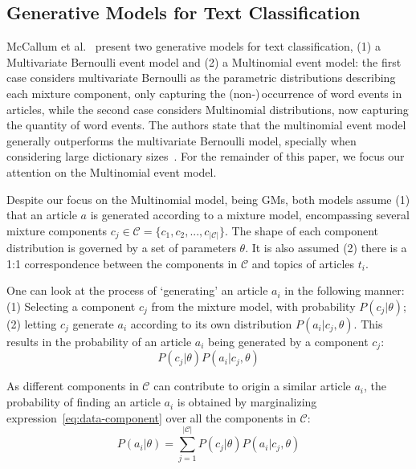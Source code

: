 \subsection{Generative Models for Text Classification}
\label{subsec:gen-models}

McCallum et al.~\cite{McCallum98acomparison} present two 
generative models for text classification, (1) a Multivariate Bernoulli event 
model and (2) a Multinomial event model: the first case considers multivariate 
Bernoulli as the parametric distributions describing each mixture component, 
only capturing the (non-)\,occurrence of word events in articles, while the 
second case considers Multinomial distributions, now capturing the quantity of 
word events. The authors state that the multinomial event model generally 
outperforms the multivariate Bernoulli model, specially when considering 
large dictionary sizes~\cite{McCallum98acomparison}. For the remainder of 
this paper, we focus our attention on the Multinomial event model.\vertbreak

Despite our focus on the Multinomial model, being GMs, both models assume (1) that an article $a$ is generated 
according to a mixture model, encompassing several mixture components $c_j \in 
\mathcal{C} = \{c_1, c_2, ..., c_{|\mathcal{C}|}\}$. The shape of each component 
distribution is governed by a set of parameters $\theta$. It is also assumed (2) there is a 1:1 
correspondence between the components in $\mathcal{C}$ and topics of articles 
$t_i$.\vertbreak

One can look at the process of 
`generating' an article $a_i$ in the following manner: (1) Selecting a 
component $c_j$ from the mixture model, with probability $P(c_j|\theta)$; (2) 
letting $c_j$ generate $a_i$ according to its own distribution 
$P(a_i|c_j,\theta)$. This results in the probability of an article $a_i$ being 
generated by a component $c_j$:
\begin{equation}
    P(c_j|\theta)P(a_i|c_j,\theta)
    \label{eq:data-component}
\end{equation}

As different components in $\mathcal{C}$ can contribute to origin a similar 
article $a_i$, the probability of finding an article $a_i$ is obtained by 
marginalizing expression~\ref{eq:data-component} over all the components in 
$\mathcal{C}$:
\begin{equation}
    P(a_i|\theta) = \sum_{j=1}^{|\mathcal{C}|}P(c_j|\theta)P(a_i|c_j,\theta)
    \label{eq:data-mixture}
\end{equation}

